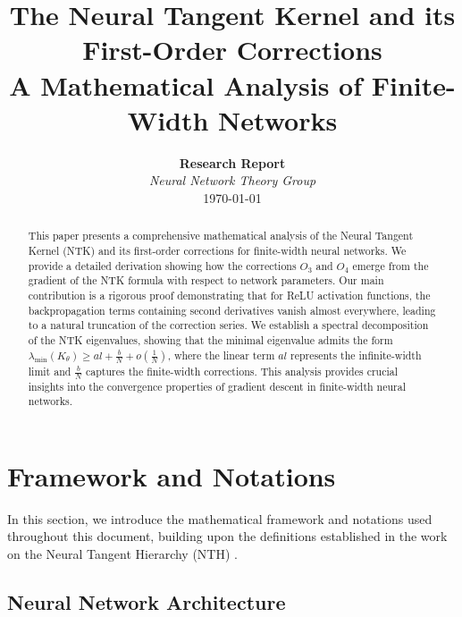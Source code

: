 \documentclass[11pt,a4paper]{article}
\title{\LARGE\textbf{The Neural Tangent Kernel and its First-Order Corrections}\\
\vspace{0.5cm}
\large A Mathematical Analysis of Finite-Width Networks}
\author{
\textbf{Research Report}\\
\vspace{0.3cm}
\textit{Neural Network Theory Group}\\
\vspace{0.2cm}
\today
}
\date{}
\theoremstyle{definition}
\begin{document}
\maketitle

\begin{abstract}
This paper presents a comprehensive mathematical analysis of the Neural Tangent Kernel (NTK) and its first-order corrections for finite-width neural networks. We provide a detailed derivation showing how the corrections $O_3$ and $O_4$ emerge from the gradient of the NTK formula with respect to network parameters. Our main contribution is a rigorous proof demonstrating that for ReLU activation functions, the backpropagation terms containing second derivatives vanish almost everywhere, leading to a natural truncation of the correction series. We establish a spectral decomposition of the NTK eigenvalues, showing that the minimal eigenvalue admits the form $\lambda_{\min}(K_\theta) \geq al + \frac{b}{N} + o(\frac{1}{N})$, where the linear term $al$ represents the infinite-width limit and $\frac{b}{N}$ captures the finite-width corrections. This analysis provides crucial insights into the convergence properties of gradient descent in finite-width neural networks.
\end{abstract}

\vspace{1cm}

\tableofcontents

\newpage

\section{Framework and Notations}

In this section, we introduce the mathematical framework and notations used throughout this document, building upon the definitions established in the work on the Neural Tangent Hierarchy (NTH) \cite{dyer2019asymptoticswidenetworksfeynman}.

\subsection{Neural Network Architecture}
\end{document}
